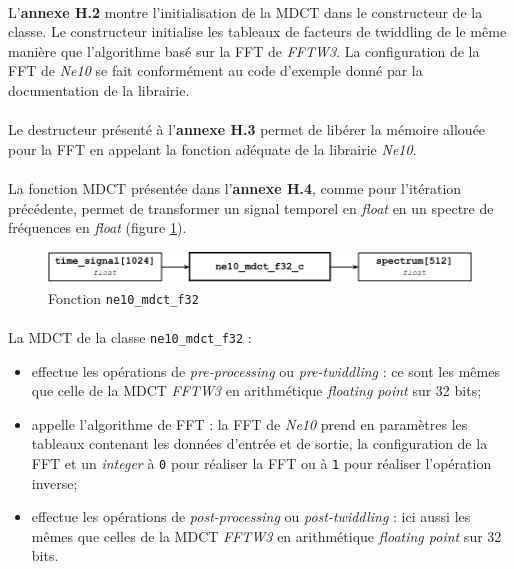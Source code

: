 \documentclass{article}
\begin{document}
    \paragraph{}
    L'\textbf{annexe H.2} montre l'initialisation de la MDCT dans le constructeur de la classe. Le constructeur initialise les tableaux de facteurs de twiddling de le même manière que l'algorithme basé sur la FFT de \emph{FFTW3}. La configuration de la FFT de \emph{Ne10} se fait conformément au code d'exemple donné par la documentation de la librairie\cite{Ne10}.

    \paragraph{}
    Le destructeur présenté à l'\textbf{annexe H.3} permet de libérer la mémoire allouée pour la FFT en appelant la fonction adéquate de la librairie \emph{Ne10}.

    \paragraph{}
    La fonction MDCT présentée dans l'\textbf{annexe H.4}, comme pour l'itération précédente, permet de transformer un signal temporel en \emph{float} en un spectre de fréquences en \emph{float} (figure \ref{fig:func_ne10_mdct_f32}).
    \begin{figure}[H]
        \centering
        \includegraphics[width=.8\linewidth]{./images/func_ne10_mdct_f32_c.pdf}
        \caption{Fonction \texttt{ne10\_mdct\_f32}}
        \label{fig:func_ne10_mdct_f32}
    \end{figure}

    \paragraph{}
    La MDCT de la classe \texttt{ne10\_mdct\_f32} :
    \begin{itemize}
        \item effectue les opérations de \emph{pre-processing} ou \emph{pre-twiddling} : ce sont les mêmes que celle de la MDCT \emph{FFTW3} en arithmétique \emph{floating point} sur 32 bits;
        \item appelle l'algorithme de FFT : la FFT de \emph{Ne10} prend en paramètres les tableaux contenant les données d'entrée et de sortie, la configuration de la FFT et un \emph{integer} à \texttt{0} pour réaliser la FFT ou à \texttt{1} pour réaliser l'opération inverse;
        \item effectue les opérations de \emph{post-processing} ou \emph{post-twiddling} : ici aussi les mêmes que celles de la MDCT \emph{FFTW3} en arithmétique \emph{floating point} sur 32 bits.
    \end{itemize}
\end{document}
